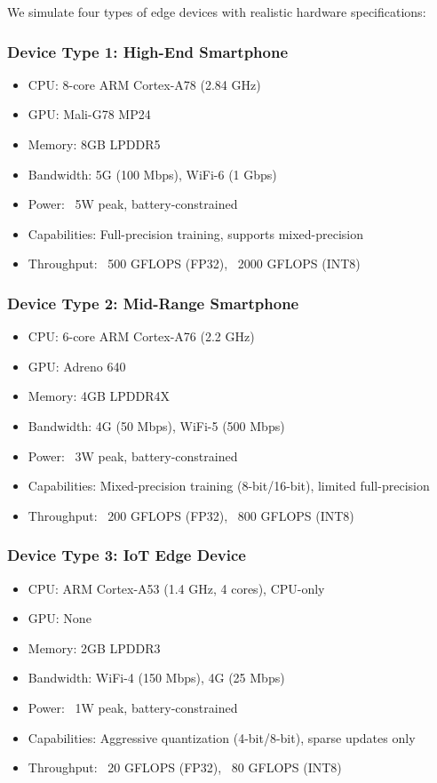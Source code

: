\documentclass[journal]{IEEEtran}
\begin{document}
We simulate four types of edge devices with realistic hardware specifications:

\subsubsection{Device Type 1: High-End Smartphone}

\begin{itemize}
    \item CPU: 8-core ARM Cortex-A78 (2.84 GHz)
    \item GPU: Mali-G78 MP24
    \item Memory: 8GB LPDDR5
    \item Bandwidth: 5G (100 Mbps), WiFi-6 (1 Gbps)
    \item Power: ~5W peak, battery-constrained
    \item Capabilities: Full-precision training, supports mixed-precision
    \item Throughput: ~500 GFLOPS (FP32), ~2000 GFLOPS (INT8)
\end{itemize}

\subsubsection{Device Type 2: Mid-Range Smartphone}

\begin{itemize}
    \item CPU: 6-core ARM Cortex-A76 (2.2 GHz)
    \item GPU: Adreno 640
    \item Memory: 4GB LPDDR4X
    \item Bandwidth: 4G (50 Mbps), WiFi-5 (500 Mbps)
    \item Power: ~3W peak, battery-constrained
    \item Capabilities: Mixed-precision training (8-bit/16-bit), limited full-precision
    \item Throughput: ~200 GFLOPS (FP32), ~800 GFLOPS (INT8)
\end{itemize}

\subsubsection{Device Type 3: IoT Edge Device}

\begin{itemize}
    \item CPU: ARM Cortex-A53 (1.4 GHz, 4 cores), CPU-only
    \item GPU: None
    \item Memory: 2GB LPDDR3
    \item Bandwidth: WiFi-4 (150 Mbps), 4G (25 Mbps)
    \item Power: ~1W peak, battery-constrained
    \item Capabilities: Aggressive quantization (4-bit/8-bit), sparse updates only
    \item Throughput: ~20 GFLOPS (FP32), ~80 GFLOPS (INT8)
\end{itemize}
\end{document}
